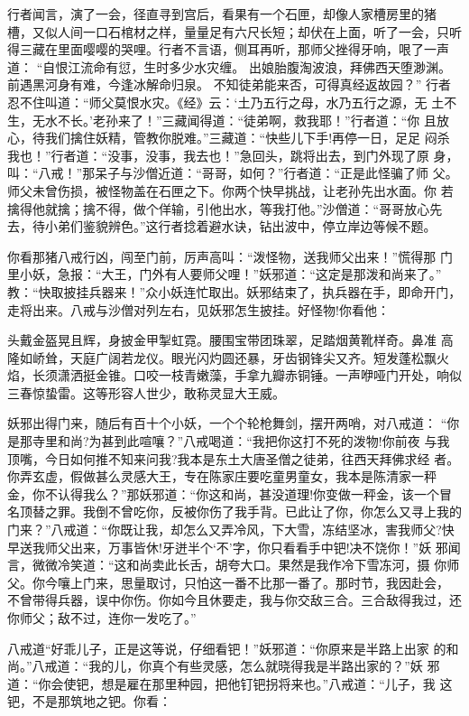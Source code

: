 行者闻言，演了一会，径直寻到宫后，看果有一个石匣，却像人家槽房里的猪
槽，又似人间一口石棺材之样，量量足有六尺长短；却伏在上面，听了一会，只听
得三藏在里面嘤嘤的哭哩。行者不言语，侧耳再听，那师父挫得牙响，哏了一声道：
“自恨江流命有愆，生时多少水灾缠。
出娘胎腹淘波浪，拜佛西天堕渺渊。
前遇黑河身有难，今逢冰解命归泉。
不知徒弟能来否，可得真经返故园？”
行者忍不住叫道：“师父莫恨水灾。《经》云：‘土乃五行之母，水乃五行之源，无
土不生，无水不长。’老孙来了！”三藏闻得道：“徒弟啊，救我耶！”行者道：“你
且放心，待我们擒住妖精，管教你脱难。”三藏道：“快些儿下手!再停一日，足足
闷杀我也！”行者道：“没事，没事，我去也！”急回头，跳将出去，到门外现了原
身，叫：“八戒！”那呆子与沙僧近道：“哥哥，如何？”行者道：“正是此怪骗了师
父。师父未曾伤损，被怪物盖在石匣之下。你两个快早挑战，让老孙先出水面。你
若擒得他就擒；擒不得，做个佯输，引他出水，等我打他。”沙僧道：“哥哥放心先
去，待小弟们鉴貌辨色。”这行者捻着避水诀，钻出波中，停立岸边等候不题。

你看那猪八戒行凶，闯至门前，厉声高叫：“泼怪物，送我师父出来！”慌得那
门里小妖，急报：“大王，门外有人要师父哩！”妖邪道：“这定是那泼和尚来了。”
教：“快取披挂兵器来！”众小妖连忙取出。妖邪结束了，执兵器在手，即命开门，
走将出来。八戒与沙僧对列左右，见妖邪怎生披挂。好怪物!你看他：

头戴金盔晃且辉，身披金甲掣虹霓。腰围宝带团珠翠，足踏烟黄靴样奇。鼻准
高隆如峤耸，天庭广阔若龙仪。眼光闪灼圆还暴，牙齿钢锋尖又齐。短发蓬松飘火
焰，长须潇洒挺金锥。口咬一枝青嫩藻，手拿九瓣赤铜锤。一声咿哑门开处，响似
三春惊蛰雷。这等形容人世少，敢称灵显大王威。

妖邪出得门来，随后有百十个小妖，一个个轮枪舞剑，摆开两哨，对八戒道：
“你是那寺里和尚?为甚到此喧嚷？”八戒喝道：“我把你这打不死的泼物!你前夜
与我顶嘴，今日如何推不知来问我?我本是东土大唐圣僧之徒弟，往西天拜佛求经
者。你弄玄虚，假做甚么灵感大王，专在陈家庄要吃童男童女，我本是陈清家一秤
金，你不认得我么？”那妖邪道：“你这和尚，甚没道理!你变做一秤金，该一个冒
名顶替之罪。我倒不曾吃你，反被你伤了我手背。已此让了你，你怎么又寻上我的
门来？”八戒道：“你既让我，却怎么又弄冷风，下大雪，冻结坚冰，害我师父?快
早送我师父出来，万事皆休!牙迸半个‘不’字，你只看看手中钯!决不饶你！”妖
邪闻言，微微冷笑道：“这和尚卖此长舌，胡夸大口。果然是我作冷下雪冻河，摄
你师父。你今嚷上门来，思量取讨，只怕这一番不比那一番了。那时节，我因赴会，
不曾带得兵器，误中你伤。你如今且休要走，我与你交敌三合。三合敌得我过，还
你师父；敌不过，连你一发吃了。”

八戒道“好乖儿子，正是这等说，仔细看钯！”妖邪道：“你原来是半路上出家
的和尚。”八戒道：“我的儿，你真个有些灵感，怎么就晓得我是半路出家的？”妖
邪道：“你会使钯，想是雇在那里种园，把他钉钯拐将来也。”八戒道：“儿子，我
这钯，不是那筑地之钯。你看：

